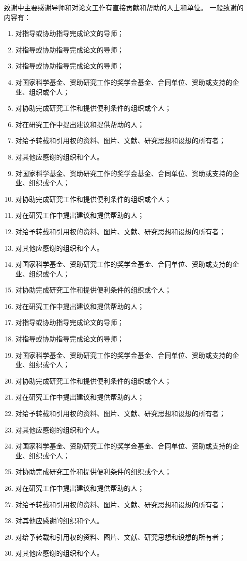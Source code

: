 \begin{acknowledgement}
致谢中主要感谢导师和对论文工作有直接贡献和帮助的人士和单位。
一般致谢的内容有：
\begin{enumerate}[label=(\chinese*),itemindent=2em]

    \item 对指导或协助指导完成论文的导师；
    \item 对指导或协助指导完成论文的导师；
    \item 对指导或协助指导完成论文的导师；
    \item 对国家科学基金、资助研究工作的奖学金基金、合同单位、资助或支持的企业、组织或个人；
    \item 对协助完成研究工作和提供便利条件的组织或个人；
    \item 对在研究工作中提出建议和提供帮助的人；
    \item 对给予转载和引用权的资料、图片、文献、研究思想和设想的所有者；
    \item 对其他应感谢的组织和个人。
    \item 对国家科学基金、资助研究工作的奖学金基金、合同单位、资助或支持的企业、组织或个人；
    \item 对协助完成研究工作和提供便利条件的组织或个人；
    \item 对在研究工作中提出建议和提供帮助的人；
    \item 对给予转载和引用权的资料、图片、文献、研究思想和设想的所有者；
    \item 对其他应感谢的组织和个人。
    \item 对国家科学基金、资助研究工作的奖学金基金、合同单位、资助或支持的企业、组织或个人；
    \item 对协助完成研究工作和提供便利条件的组织或个人；
    \item 对在研究工作中提出建议和提供帮助的人；
    \item 对指导或协助指导完成论文的导师；
    \item 对指导或协助指导完成论文的导师；
    \item 对国家科学基金、资助研究工作的奖学金基金、合同单位、资助或支持的企业、组织或个人；
    \item 对协助完成研究工作和提供便利条件的组织或个人；
    \item 对在研究工作中提出建议和提供帮助的人；
    \item 对给予转载和引用权的资料、图片、文献、研究思想和设想的所有者；
    \item 对其他应感谢的组织和个人。
    \item 对国家科学基金、资助研究工作的奖学金基金、合同单位、资助或支持的企业、组织或个人；
    \item 对协助完成研究工作和提供便利条件的组织或个人；
    \item 对在研究工作中提出建议和提供帮助的人；
    \item 对给予转载和引用权的资料、图片、文献、研究思想和设想的所有者；
    \item 对其他应感谢的组织和个人。
    \item 对给予转载和引用权的资料、图片、文献、研究思想和设想的所有者；
    \item 对其他应感谢的组织和个人。


\end{enumerate}
\end{acknowledgement}
